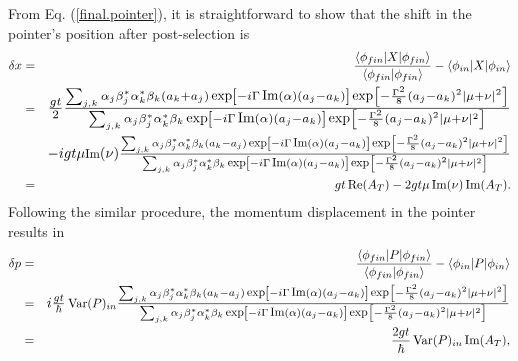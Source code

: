 \documentclass[aps,pra,preprint,superscriptaddress, showpacs]{revtex4-2}
\newcommand*{\Scale}[2][4]{\scalebox{#1}{$#2$}}%
\newcommand*{\Resize}[2]{\resizebox{#1}{!}{$#2$}}%
\begin{document}
From Eq. (\ref{final.pointer}), it is straightforward to show that the shift in the pointer's position after post-selection is
\begin{eqnarray}\label{position.shift}
\delta x &=& \frac{\langle \phi_{fin}|X|\phi_{fin} \rangle}{\langle \phi_{fin}|\phi_{fin}\rangle}-\langle \phi_{in}|X|\phi_{in} \rangle \nonumber \\
&=&\Resize{13cm}{\frac{gt}{2}\frac{\sum_{j,k}\alpha_{j}\beta_{j}^{*}\alpha_{k}^{*}\beta_{k}\left(a_{k}+a_{j}\right)\,\Scale[0.82]{\textrm{exp}}\left[-i\Gamma\,\Scale[0.82]{\textrm{Im}}(\alpha)\left(a_{j}-a_{k}\right)\right]\,\Scale[0.82]{\textrm{exp}}\left[-\frac{\Gamma^{2}}{8}\left(a_{j}-a_{k}\right)^{2}|\mu+\nu|^2\right]}{\sum_{j,k}\alpha_{j}\beta_{j}^{*}\alpha_{k}^{*}\beta_{k}\,\Scale[0.85]{\textrm{exp}}\left[-i\Gamma\,\Scale[0.85]{\textrm{Im}}(\alpha)\left(a_{j}-a_{k}\right)\right]\,\Scale[0.85]{\textrm{exp}}\left[-\frac{\Gamma^{2}}{8}\left(a_{j}-a_{k}\right)^{2}|\mu+\nu|^2\right]}} \nonumber \\
&&  \Resize{13cm}{-igt\mu\Scale[0.85]{\textrm{Im}}(\nu)\frac{\sum_{j,k}\alpha_{j}\beta_{j}^{*}\alpha_{k}^{*}\beta_{k}\left(a_{k}-a_{j}\right)\,\Scale[0.82]{\textrm{exp}}\left[-i\Gamma\,\Scale[0.82]{\textrm{Im}}(\alpha)\left(a_{j}-a_{k}\right)\right]\,\Scale[0.82]{\textrm{exp}}\left[-\frac{\Gamma^{2}}{8}\left(a_{j}-a_{k}\right)^{2}|\mu+\nu|^2\right]}{\sum_{j,k}\alpha_{j}\beta_{j}^{*}\alpha_{k}^{*}\beta_{k}\,\Scale[0.82]{\textrm{exp}}\left[-i\Gamma\,\Scale[0.82]{\textrm{Im}}(\alpha)\left(a_{j}-a_{k}\right)\right]\,\Scale[0.82]{\textrm{exp}}\left[-\frac{\Gamma^{2}}{8}\left(a_{j}-a_{k}\right)^{2}|\mu+\nu|^2\right]}}\nonumber \\
&=& gt \,\textrm{Re}(A_{T})-2gt\mu\,\textrm{Im}(\nu)\,\textrm{Im}(A_{T}).
\end{eqnarray}
Following the similar procedure, the momentum displacement in the pointer results in
\begin{eqnarray}\label{momentum.shift}
\delta p &=& \frac{\langle \phi_{fin}|P|\phi_{fin} \rangle}{\langle \phi_{fin}|\phi_{fin}\rangle}-\langle \phi_{in}|P|\phi_{in}\rangle \nonumber \\
&=&\Resize{13cm}{i\frac{gt}{\hbar}\,\Scale[0.85]{\textrm{Var}(P)_{in}}\frac{\sum_{j,k}\alpha_{j}\beta_{j}^{*}\alpha_{k}^{*}\beta_{k}\left(a_{k}-a_{j}\right)\,\Scale[0.82]{\textrm{exp}}\left[-i\Gamma\,\Scale[0.82]{\textrm{Im}}(\alpha)\left(a_{j}-a_{k}\right)\right]\,\Scale[0.82]{\textrm{exp}}\left[-\frac{\Gamma^{2}}{8}\left(a_{j}-a_{k}\right)^{2}|\mu+\nu|^2\right]}{\sum_{j,k}\alpha_{j}\beta_{j}^{*}\alpha_{k}^{*}\beta_{k}\,\Scale[0.82]{\textrm{exp}}\left[-i\Gamma\,\Scale[0.82]{\textrm{Im}}(\alpha)\left(a_{j}-a_{k}\right)\right]\,\Scale[0.82]{\textrm{exp}}\left[-\frac{\Gamma^{2}}{8}\left(a_{j}-a_{k}\right)^{2}|\mu+\nu|^2\right]}} \nonumber \\
&=& \frac{2gt}{\hbar}\,\textrm{Var}(P)_{in}\, \textrm{Im}(A_{T}),
\end{eqnarray}
\end{document}
